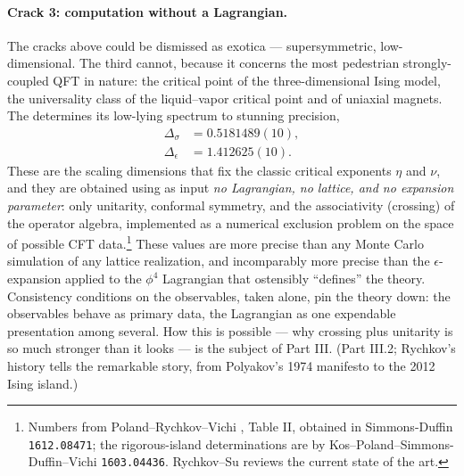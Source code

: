 \paragraph{Crack 3: computation without a Lagrangian.}
The cracks above could be dismissed as exotica --- supersymmetric,
low-dimensional. The third cannot, because it concerns the most pedestrian
strongly-coupled QFT in nature: the critical point of the three-dimensional
Ising model, the universality class of the liquid--vapor critical point and of
uniaxial magnets. The  determines its low-lying
spectrum to stunning precision,
\begin{equation}
\begin{aligned}
\Delta_\sigma &= 0.5181489(10),\\
\Delta_\epsilon &= 1.412625(10).
\end{aligned}
\label{eq:ising-dims}
\end{equation}
These are the scaling dimensions that fix the classic critical exponents $\eta$
and $\nu$, and they are obtained using as input \emph{no Lagrangian, no lattice,
and no expansion parameter}: only unitarity, conformal symmetry, and the
associativity (crossing) of the operator algebra, implemented as a numerical
exclusion problem on the space of possible CFT data.\footnote{Numbers from
Poland--Rychkov--Vichi , Table II, obtained in Simmons-Duffin
\texttt{1612.08471}; the rigorous-island determinations are by
Kos--Poland--Simmons-Duffin--Vichi \texttt{1603.04436}. Rychkov--Su
 reviews the current state of the art.} These values are more
precise than any Monte Carlo simulation of any lattice realization, and
incomparably more precise than the $\epsilon$-expansion applied to the $\phi^4$
Lagrangian that ostensibly ``defines'' the theory. Consistency conditions on the
observables, taken alone, pin the theory down: the observables behave as primary
data, the Lagrangian as one expendable presentation among several. How this is
possible --- why crossing plus unitarity is so much stronger than it looks ---
is the subject of Part III. (Part III.2; Rychkov's history 
tells the remarkable story, from Polyakov's 1974 manifesto to the 2012 Ising
island.)

